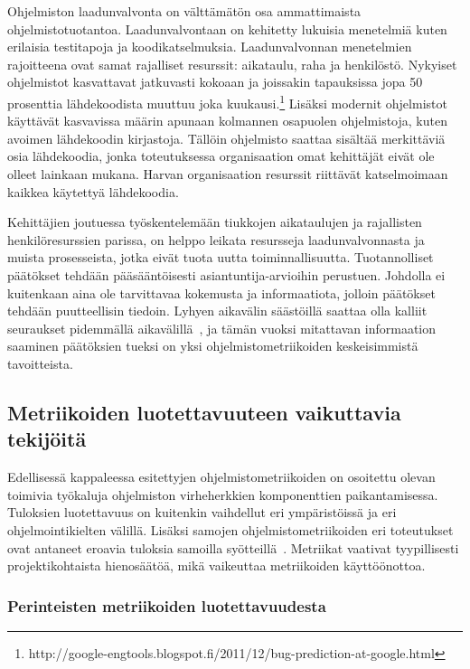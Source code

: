 \documentclass[finnish]{tktltiki2}
\theoremstyle{definition}
\theoremstyle{remark}
\begin{document}
Ohjelmiston laadunvalvonta on välttämätön osa ammattimaista ohjelmistotuotantoa. Laadunvalvontaan on kehitetty lukuisia menetelmiä kuten erilaisia testitapoja ja koodikatselmuksia. Laadunvalvonnan menetelmien rajoitteena ovat samat rajalliset resurssit: aikataulu, raha ja henkilöstö. Nykyiset ohjelmistot kasvattavat jatkuvasti kokoaan ja joissakin tapauksissa jopa 50 prosenttia lähdekoodista muuttuu joka kuukausi.\footnote{http://google-engtools.blogspot.fi/2011/12/bug-prediction-at-google.html} Lisäksi modernit ohjelmistot käyttävät kasvavissa määrin apunaan kolmannen osapuolen ohjelmistoja, kuten avoimen lähdekoodin kirjastoja. Tällöin ohjelmisto saattaa sisältää merkittäviä osia lähdekoodia, jonka toteutuksessa organisaation omat kehittäjät eivät ole olleet lainkaan mukana. Harvan organisaation resurssit riittävät katselmoimaan kaikkea käytettyä lähdekoodia.

Kehittäjien joutuessa työskentelemään tiukkojen aikataulujen ja rajallisten henkilöresurssien parissa, on helppo leikata resursseja laadunvalvonnasta ja muista prosesseista, jotka eivät tuota uutta toiminnallisuutta. Tuotannolliset päätökset tehdään pääsääntöisesti asiantuntija-arvioihin perustuen. Johdolla ei kuitenkaan aina ole tarvittavaa kokemusta ja informaatiota, jolloin päätökset tehdään puutteellisin tiedoin. Lyhyen aikavälin säästöillä saattaa olla kalliit seuraukset pidemmällä aikavälillä~\cite{T02}, ja tämän vuoksi mitattavan informaation saaminen päätöksien tueksi on yksi ohjelmistometriikoiden keskeisimmistä tavoitteista.

\subsection{Metriikoiden luotettavuuteen vaikuttavia tekijöitä}

Edellisessä kappaleessa esitettyjen ohjelmistometriikoiden on osoitettu olevan toimivia työkaluja ohjelmiston virheherkkien komponenttien paikantamisessa. Tuloksien luotettavuus on kuitenkin vaihdellut eri ympäristöissä ja eri ohjelmointikielten välillä. Lisäksi samojen ohjelmistometriikoiden eri toteutukset ovat antaneet eroavia tuloksia samoilla syötteillä~\cite{LLL08}. Metriikat vaativat tyypillisesti projektikohtaista hienosäätöä, mikä vaikeuttaa metriikoiden käyttöönottoa.

\subsubsection{Perinteisten metriikoiden luotettavuudesta}
\end{document}
